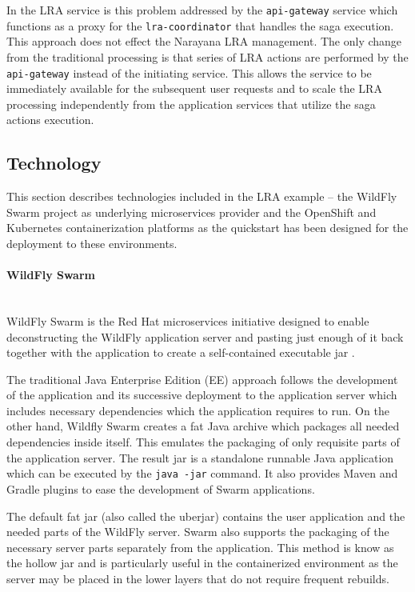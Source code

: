 \documentclass[oneside,
  digital, %
  table,   %
  nolof,     %
  nolot,     %
]{fithesis3}
\newcommand{\newlinepar}[1]{\paragraph{#1}\needspace{4\baselineskip}\mbox{}\\}
\begin{document}
In the LRA service is this problem addressed by the \texttt{api-gateway} service which functions as a proxy for the \texttt{lra-coordinator} that handles the saga execution. This approach does not effect the Narayana LRA management. The only change from the traditional processing is that series of LRA actions are performed by the \texttt{api-gateway} instead of the initiating service. This allows the service to be immediately available for the subsequent user requests and to scale the LRA processing independently from the application services that utilize the saga actions execution.

\subsection{Technology}

This section describes technologies included in the LRA example -- the WildFly Swarm project as underlying microservices provider and the OpenShift and Kubernetes containerization platforms as the quickstart has been designed for the deployment to these environments.

\newlinepar{WildFly Swarm}

WildFly Swarm is the Red Hat microservices initiative designed to enable deconstructing the WildFly application server and pasting just enough of it back together with the application to create a self-contained executable jar \cite{gupta_2018}. 

The traditional Java Enterprise Edition (EE) approach follows the development of the application and its successive deployment to the application server which includes necessary dependencies which the application requires to run. On the other hand, Wildfly Swarm creates a fat Java archive which packages all needed dependencies inside itself. This emulates the packaging of only requisite parts of the application server. The result jar is a standalone runnable Java application which can be executed by the \texttt{java -jar} command. It also provides Maven and Gradle plugins to ease the development of Swarm applications.

The default fat jar (also called the uberjar) contains the user application and the needed parts of the WildFly server. Swarm also supports the packaging of the necessary server parts separately from the application. This method is know as the hollow jar and is particularly useful in the containerized environment as the server may be placed in the lower layers that do not require frequent rebuilds.
\end{document}
